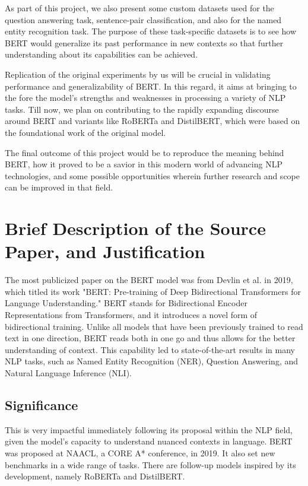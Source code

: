 ﻿\documentclass{article}
\begin{document}
As part of this project, we also present some custom datasets used for the question answering task, sentence-pair classification, and also for the named entity recognition task. The purpose of these task-specific datasets is to see how BERT would generalize its past performance in new contexts so that further understanding about its capabilities can be achieved.

Replication of the original experiments by us will be crucial in validating performance and generalizability of BERT. In this regard, it aims at bringing to the fore the model's strengths and weaknesses in processing a variety of NLP tasks. Till now, we plan on contributing to the rapidly expanding discourse around BERT and variants like RoBERTa and DistilBERT, which were based on the foundational work of the original model.

The final outcome of this project would be to reproduce the meaning behind BERT, how it proved to be a savior in this modern world of advancing NLP technologies, and some possible opportunities wherein further research and scope can be improved in that field.

\section{Brief Description of the Source Paper, and Justification}
The most publicized paper on the BERT model was from Devlin et al. in 2019, which titled its work "BERT: Pre-training of Deep Bidirectional Transformers for Language Understanding." BERT stands for Bidirectional Encoder Representations from Transformers, and it introduces a novel form of bidirectional training. Unlike all models that have been previously trained to read text in one direction, BERT reads both in one go and thus allows for the better understanding of context. This capability led to state-of-the-art results in many NLP tasks, such as Named Entity Recognition (NER), Question Answering, and Natural Language Inference (NLI).

\subsection{Significance}
This is very impactful immediately following its proposal within the NLP field, given the model's capacity to understand nuanced contexts in language. BERT was proposed at NAACL, a CORE A* conference, in 2019. It also set new benchmarks in a wide range of tasks. There are follow-up models inspired by its development, namely RoBERTa and DistilBERT.
\end{document}

